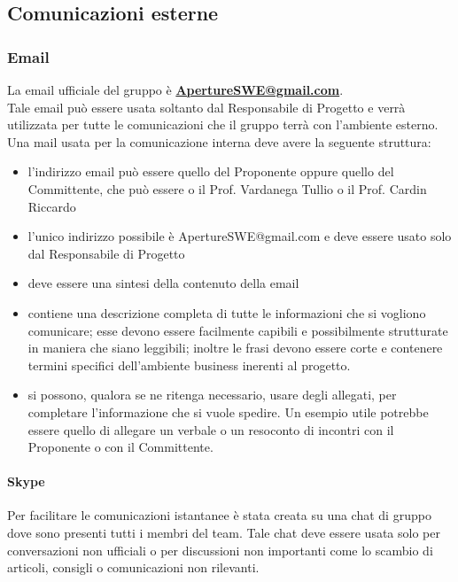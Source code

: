 \subsection{Comunicazioni esterne}
\subsubsection{Email}
La email ufficiale del gruppo è \textbf{\url{ApertureSWE@gmail.com}}.\\
Tale email può essere usata soltanto dal Responsabile di Progetto e verrà utilizzata per tutte le comunicazioni che il gruppo terrà con l'ambiente esterno.
Una mail usata per la comunicazione interna deve avere la seguente struttura:
\begin{itemize}
\item {}l'indirizzo email può essere quello del Proponente oppure quello del Committente, che può essere o il Prof. Vardanega Tullio o il Prof. Cardin Riccardo
\item {}l'unico indirizzo possibile è ApertureSWE@gmail.com e deve essere usato solo dal Responsabile di Progetto
\item {} deve essere una sintesi della contenuto della email
\item {} contiene una descrizione completa di tutte le informazioni che si vogliono comunicare; esse devono essere facilmente capibili e possibilmente strutturate in maniera che siano leggibili; inoltre le frasi devono essere corte e contenere termini specifici dell'ambiente business inerenti al progetto.
\item {} si possono, qualora se ne ritenga necessario, usare degli allegati, per completare l'informazione che si vuole spedire. Un esempio utile potrebbe essere quello di allegare un verbale o un resoconto di incontri con il Proponente  o con il Committente.
\end{itemize}

\paragraph{Skype \\}
\label{3.2.1}
Per facilitare le comunicazioni istantanee è stata creata su  una chat di gruppo dove sono presenti tutti i membri del team. Tale chat deve essere usata solo per conversazioni non ufficiali o per discussioni non importanti come lo scambio di articoli, consigli o comunicazioni non rilevanti.

